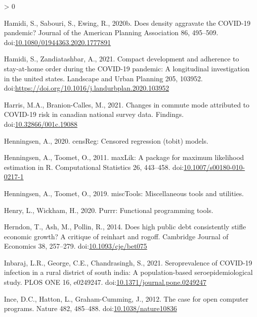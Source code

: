 \documentclass[]{elsarticle} %
\newlength{\cslhangindent}
\newenvironment{CSLReferences}[2] %
 {%
  \setlength{\parindent}{0pt}
  \ifodd #1 \everypar{\setlength{\hangindent}{\cslhangindent}}\ignorespaces\fi
  \ifnum #2 > 0
  \setlength{\parskip}{#2\baselineskip}
  \fi
 }%
 {}
\begin{document}
\begin{CSLReferences}{1}{0}
\leavevmode\hypertarget{ref-Hamidi2020density}{}%
Hamidi, S., Sabouri, S., Ewing, R., 2020b. Does density aggravate the
COVID-19 pandemic? Journal of the American Planning Association 86,
495--509.
doi:\href{https://doi.org/10.1080/01944363.2020.1777891}{10.1080/01944363.2020.1777891}

\leavevmode\hypertarget{ref-Hamidi2021compact}{}%
Hamidi, S., Zandiatashbar, A., 2021. Compact development and adherence
to stay-at-home order during the COVID-19 pandemic: A longitudinal
investigation in the united states. Landscape and Urban Planning 205,
103952. doi:\url{https://doi.org/10.1016/j.landurbplan.2020.103952}

\leavevmode\hypertarget{ref-Harris2021Changes}{}%
Harris, M.A., Branion-Calles, M., 2021. Changes in commute mode
attributed to COVID-19 risk in canadian national survey data. Findings.
doi:\href{https://doi.org/10.32866/001c.19088}{10.32866/001c.19088}

\leavevmode\hypertarget{ref-R-censReg}{}%
Henningsen, A., 2020. censReg: Censored regression (tobit) models.

\leavevmode\hypertarget{ref-maxLik2011}{}%
Henningsen, A., Toomet, O., 2011. maxLik: A package for maximum
likelihood estimation in {R}. Computational Statistics 26, 443--458.
doi:\href{https://doi.org/10.1007/s00180-010-0217-1}{10.1007/s00180-010-0217-1}

\leavevmode\hypertarget{ref-R-miscTools}{}%
Henningsen, A., Toomet, O., 2019. miscTools: Miscellaneous tools and
utilities.

\leavevmode\hypertarget{ref-R-purrr}{}%
Henry, L., Wickham, H., 2020. Purrr: Functional programming tools.

\leavevmode\hypertarget{ref-Herndon2014high}{}%
Herndon, T., Ash, M., Pollin, R., 2014. Does high public debt
consistently stifle economic growth? A critique of reinhart and rogoff.
Cambridge Journal of Economics 38, 257--279.
doi:\href{https://doi.org/10.1093/cje/bet075}{10.1093/cje/bet075}

\leavevmode\hypertarget{ref-Inbaraj2021seroprevalence}{}%
Inbaraj, L.R., George, C.E., Chandrasingh, S., 2021. Seroprevalence of
COVID-19 infection in a rural district of south india: A
population-based seroepidemiological study. PLOS ONE 16, e0249247.
doi:\href{https://doi.org/10.1371/journal.pone.0249247}{10.1371/journal.pone.0249247}

\leavevmode\hypertarget{ref-Ince2012case}{}%
Ince, D.C., Hatton, L., Graham-Cumming, J., 2012. The case for open
computer programs. Nature 482, 485--488.
doi:\href{https://doi.org/10.1038/nature10836}{10.1038/nature10836}


\end{CSLReferences}
\end{document}
